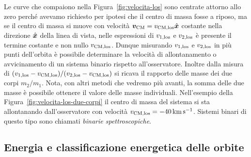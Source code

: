 {Le curve che compaiono nella Figura~\ref{fig:velocita-los} sono centrate attorno
allo zero perché avevamo richiesto per ipotesi che il centro di massa fosse a
riposo, ma se il centro di massa si muove con velocità
$\bm{v}_\textup{CM} = v_\textup{CM,los}\hat{\bm{x}}$ costante nella direzione
$\hat{\bm{x}}$ della linea di vista, nelle espressioni di $v_{1,\textup{los}}$ e
$v_{2,\textup{los}}$ è presente il termine costante e non nullo
$v_\textup{CM,los}$. Dunque misurando $v_{1,\textup{los}}$ e
$v_{2,\textup{los}}$ in più punti dell'orbita è possibile determinare la
velocità di allontanamento o avvicinamento di un sistema binario rispetto
all'osservatore. Inoltre dalla misura di
$(v_{1,\textup{los}}-v_{\textup{CM,los}})/(v_{2,\textup{los}}-v_{\textup{CM,los}})$
si ricava il rapporto delle masse dei due corpi $m_2/m_1$. Nota, con altri
metodi che vedremo più avanti, la somma delle due masse è possibile ottenere il
valore delle masse individuali. Nell'esempio della
Figura~\ref{fig:velocita-los-due-corpi} il centro di massa del sistema si sta
allontanando dall'osservatore con velocità $v_\textup{CM,los} =
\SI{-40}{\kilo\metre\per\second}$. Sistemi binari di questo tipo sono chiamati
\emph{binarie spettroscopiche}.

\subsection{Energia e classificazione energetica delle orbite}
\label{sec:energia-orbite}

}
